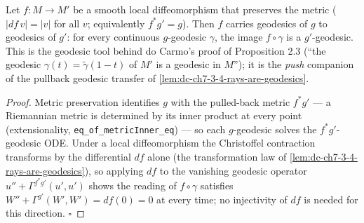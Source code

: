 \begin{lemma}
  \label{lem:dc-ch7-2-3-geodesic-push}
  \leanok
  Let $f:M\to M'$ be a smooth local diffeomorphism that preserves the metric
  ($|df\,v|=|v|$ for all $v$; equivalently $f^*g'=g$). Then $f$ carries geodesics of $g$ to
  geodesics of $g'$: for every continuous $g$-geodesic $\gamma$, the image $f\circ\gamma$ is a
  $g'$-geodesic. This is the geodesic tool behind do Carmo's proof of Proposition 2.3 (``the
  geodesic $\gamma(t)=\tilde\gamma(1-t)$ of $M'$ is a geodesic in $M$''); it is the \emph{push}
  companion of the pullback geodesic transfer of \cref{lem:dc-ch7-3-4-rays-are-geodesics}.
\end{lemma}
\begin{proof}
  \leanok
  Metric preservation identifies $g$ with the pulled-back metric $f^*g'$ — a Riemannian
  metric is determined by its inner product at every point (extensionality,
  \texttt{eq\_of\_metricInner\_eq}) — so each $g$-geodesic solves the $f^*g'$-geodesic ODE.
  Under a local diffeomorphism the Christoffel contraction transforms by the differential
  $df$ alone (the transformation law of \cref{lem:dc-ch7-3-4-rays-are-geodesics}), so applying
  $df$ to the vanishing geodesic operator $u''+\Gamma^{f^*g'}(u',u')$ shows the reading of
  $f\circ\gamma$ satisfies $W''+\Gamma^{g'}(W',W')=df(0)=0$ at every time; no injectivity of
  $df$ is needed for this direction. $\square$
\end{proof}

